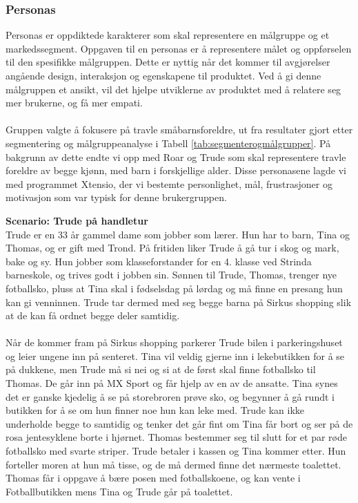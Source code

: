 \subsubsection{Personas}
Personas er oppdiktede karakterer som skal representere en målgruppe og et markedssegment\cite{feltstudie}. Oppgaven til en personas er å representere målet og oppførselen til den spesifikke målgruppen. Dette er nyttig når det kommer til avgjørelser angående design, interaksjon og egenskapene til produktet. Ved å gi denne målgruppen et ansikt, vil det hjelpe utviklerne av produktet med å relatere seg mer brukerne, og få mer empati. %
\\\\
Gruppen valgte å fokusere på travle småbarnsforeldre, ut fra resultater gjort etter segmentering og målgruppeanalyse i Tabell \ref{tab:segmenterogmålgrupper}. På bakgrunn av dette endte vi opp med Roar og Trude som skal representere travle foreldre av begge kjønn, med barn i forskjellige alder. Disse personasene lagde vi med programmet Xtensio, der vi bestemte personlighet, mål, frustrasjoner og motivasjon som var typisk for denne brukergruppen.


\noindent\textbf{Scenario: Trude på handletur}\\
Trude er en 33 år gammel dame som jobber som lærer. Hun har to barn, Tina og Thomas, og er gift med Trond. På fritiden liker Trude å gå tur i skog og mark, bake og sy. Hun jobber som klasseforstander for en 4. klasse ved Strinda barneskole, og trives godt i jobben sin. Sønnen til Trude, Thomas, trenger nye fotballsko, pluss at Tina skal i fødselsdag på lørdag og må finne en presang hun kan gi venninnen. Trude tar dermed med seg begge barna på Sirkus shopping slik at de kan få ordnet begge deler samtidig. 
\\\\
Når de kommer fram på Sirkus shopping parkerer Trude bilen i parkeringshuset og leier ungene inn på senteret. Tina vil veldig gjerne inn i lekebutikken for å se på dukkene, men Trude må si nei og si at de først skal finne fotballsko til Thomas. De går inn på MX Sport og får hjelp av en av de ansatte. Tina synes det er ganske kjedelig å se på storebroren prøve sko, og begynner å gå rundt i butikken for å se om hun finner noe hun kan leke med. Trude kan ikke underholde begge to samtidig og tenker det går fint om Tina får bort og ser på de rosa jentesyklene borte i hjørnet. Thomas bestemmer seg til slutt for et par røde fotballsko med svarte striper. Trude betaler i kassen og Tina kommer etter. Hun forteller moren at hun må tisse, og de må dermed finne det nærmeste toalettet. Thomas får i oppgave å bære posen med fotballskoene, og kan vente i Fotballbutikken mens Tina og Trude går på toalettet.

